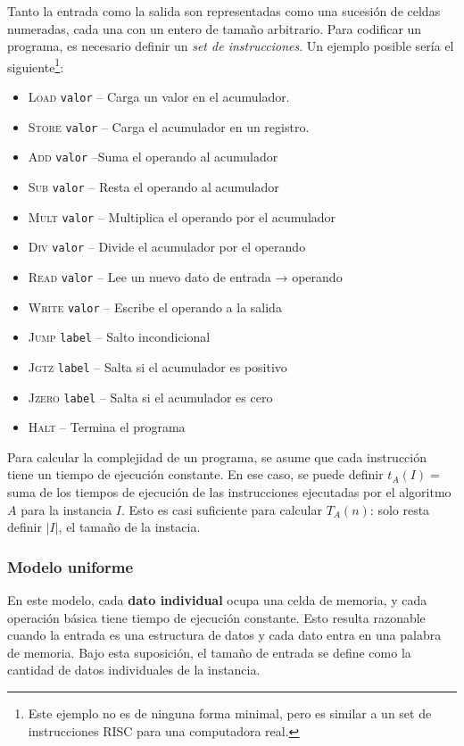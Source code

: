 \documentclass[a4paper]{report}
\newcommand{\code}{\texttt}
\begin{document}
Tanto la entrada como la salida son representadas como una sucesión de celdas numeradas, cada una con un entero de tamaño arbitrario. Para codificar un programa, es necesario definir un \textit{set de instrucciones}. Un ejemplo posible sería el siguiente\footnote{Este ejemplo no es de ninguna forma minimal, pero es similar a un set de instrucciones RISC para una computadora real.}:
\begin{itemize}
    \item \textsc{Load} \code{valor} -- Carga un valor en el acumulador.
    \item \textsc{Store} \code{valor} -- Carga el acumulador en un registro.
    \item \textsc{Add} \code{valor} --Suma el operando al acumulador
    \item \textsc{Sub} \code{valor} -- Resta el operando al acumulador
    \item \textsc{Mult} \code{valor} -- Multiplica el operando por el acumulador
    \item \textsc{Div} \code{valor} -- Divide el acumulador por el operando
    \item \textsc{Read} \code{valor} -- Lee un nuevo dato de entrada → operando
    \item \textsc{Write} \code{valor} -- Escribe el operando a la salida
    \item \textsc{Jump} \code{label} -- Salto incondicional
    \item \textsc{Jgtz} \code{label} -- Salta si el acumulador es positivo
    \item \textsc{Jzero} \code{label} -- Salta si el acumulador es cero
    \item \textsc{Halt} -- Termina el programa
\end{itemize}

Para calcular la complejidad de un programa, se asume que cada instrucción tiene un tiempo de ejecución constante. En ese caso, se puede definir $t_A(I) = $ suma de los tiempos de ejecución de las instrucciones ejecutadas por el algoritmo $A$ para la instancia $I$. Esto es casi suficiente para calcular $T_A(n)$: solo resta definir $|I|$, el tamaño de la instacia.

\subsubsection{Modelo uniforme}

En este modelo, cada \textbf{dato individual} ocupa una celda de memoria, y cada operación básica tiene tiempo de ejecución constante. Esto resulta razonable cuando la entrada es una estructura de datos y cada dato entra en una palabra de memoria. Bajo esta suposición, el tamaño de entrada se define como la cantidad de datos individuales de la instancia.
\end{document}
